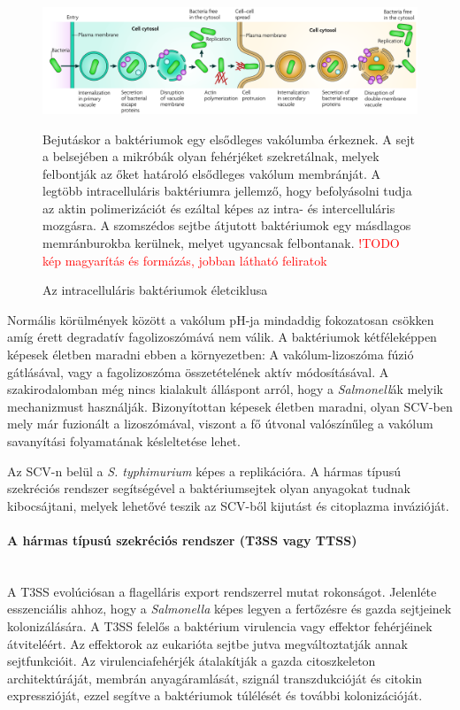 \documentclass[a4paper,12pt]{article}
\begin{document}
		 \begin{figure}[H]
			 \centering
			 \includegraphics[scale=0.42]{img/salmonella_life_cycle.png}
			 \caption{Az intracelluláris baktériumok életciklusa}
			 Bejutáskor a baktériumok egy elsődleges vakólumba érkeznek. A sejt a belsejében a mikróbák olyan fehérjéket szekretálnak, melyek felbontják az őket határoló elsődleges vakólum membránját. A legtöbb intracelluláris baktériumra jellemző, hogy befolyásolni tudja az aktin polimerizációt és ezáltal képes az intra- és intercelluláris mozgásra. A szomszédos sejtbe átjutott baktériumok egy másdlagos memránburokba kerülnek, melyet ugyancsak felbontanak.
			\textcolor{red}{!TODO kép magyarítás és formázás, jobban látható feliratok}
			 \label{fig:salmo_cycle}
		 \end{figure}
		
		 Normális körülmények között a vakólum pH-ja mindaddig fokozatosan csökken amíg érett degradatív fagolizoszómává nem válik. A baktériumok kétféleképpen képesek életben maradni ebben a környezetben: A vakólum-lizoszóma fúzió gátlásával, vagy a fagolizoszóma összetételének aktív módosításával. \cite{salmonella_autophagy_nature_old} A szakirodalomban még nincs kialakult álláspont arról, hogy a \textit{Salmonell}ák melyik mechanizmust használják. Bizonyítottan képesek életben maradni, olyan SCV-ben mely már fuzionált a lizoszómával, viszont a fő útvonal valószínűleg a vakólum savanyítási folyamatának késleltetése lehet. \cite{salmonella_and_host_cell_nature} 
		 
		 Az SCV-n belül a \textit{S. typhimurium} képes a replikációra. A hármas típusú szekréciós rendszer segítségével a baktériumsejtek olyan anyagokat tudnak kibocsájtani, melyek lehetővé teszik az SCV-ből kijutást és citoplazma invázióját. \cite{salmonella_authopagy_intro}
		 
		 \paragraph{A hármas típusú szekréciós rendszer (T3SS vagy TTSS)} \mbox{}\\
		 A T3SS evolúciósan a flagelláris export rendszerrel mutat rokonságot. Jelenléte esszenciális ahhoz, hogy a \textit{Salmonella} képes legyen a fertőzésre és gazda sejtjeinek kolonizálására. A T3SS felelős a baktérium virulencia vagy effektor fehérjéinek átviteléért. Az effektorok az eukarióta sejtbe jutva megváltoztatják annak sejtfunkcióit. Az virulenciafehérjék átalakítják a gazda citoszkeleton architektúráját, membrán anyagáramlását, szignál transzdukcióját és citokin expresszióját, ezzel segítve a baktériumok túlélését és további kolonizációját. \cite{salmonella_and_host_cell_nature}
		 
\end{document}
